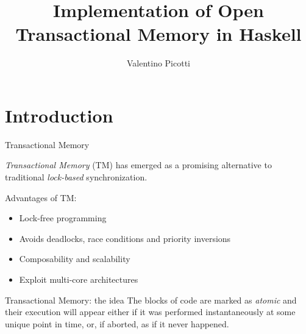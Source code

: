 \documentclass[beamer={noamsthm,10pt},target=bach]{thud}[2014/03/11]
\title{Implementation of Open Transactional Memory in Haskell}
\author{Valentino Picotti}
\begin{document}
\maketitle

\begin{frame}
\tableofcontents
\end{frame}

\section{Introduction}

\begin{frame}{Transactional Memory}


\emph{Transactional Memory} (TM) has emerged as a promising alternative to traditional \emph{lock-based} synchronization.

Advantages of TM:
\begin{itemize}
\item Lock-free programming
\item Avoids deadlocks, race conditions and priority inversions
\item Composability and scalability
\item Exploit multi-core architectures
\end{itemize}
\end{frame}

\begin{frame}{Transactional Memory: the idea}
The blocks of code are marked as \emph{atomic} and their execution will appear either if it was performed instantaneously at some unique point in time, or, if aborted, as if it never happened.
\end{frame}
\end{document}
